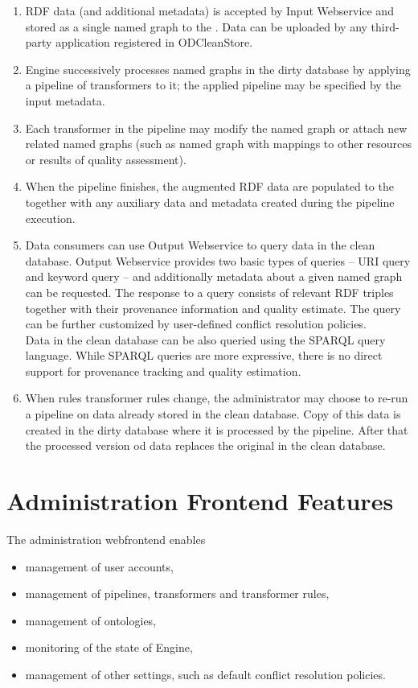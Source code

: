 \begin{enumerate}
  \item RDF data (and additional metadata) is accepted by Input Webservice and stored as a single named graph to the . Data can be uploaded by any third-party application registered in ODCleanStore.
  \item Engine successively processes named graphs in the dirty database by applying a pipeline of transformers to it; the applied pipeline may be specified by the input metadata.
  \item Each transformer in the pipeline may modify the named graph or attach new related named graphs (such as named graph with mappings to other resources or results of quality assessment).
  \item When the pipeline finishes, the augmented RDF data are populated to the  together with any auxiliary data and metadata created during the pipeline execution.
  \item Data consumers can use Output Webservice to query data in the clean database. Output Webservice provides two basic types of queries -- URI query and keyword query -- and additionally metadata about a given named graph can be requested. The response to a query consists of relevant RDF triples together with their provenance information and quality estimate. The query can be further customized by user-defined conflict resolution policies.\\
	Data in the clean database can be also queried using the SPARQL query language. While SPARQL queries are more expressive, there is no direct support for provenance tracking and quality estimation. 
  \item When rules transformer rules change, the administrator may choose to re-run a pipeline on data already stored in the clean database. Copy of this data is created in the dirty database where it is processed by the pipeline. After that the processed version od data replaces the original in the clean database.
\end{enumerate}

\section{Administration Frontend Features}
The administration webfrontend enables
\begin{itemize}
  \item management of user accounts,
  \item management of pipelines, transformers and transformer rules,
  \item management of ontologies,
  \item monitoring of the state of Engine,
  \item management of other settings, such as default conflict resolution policies.  
\end{itemize}

